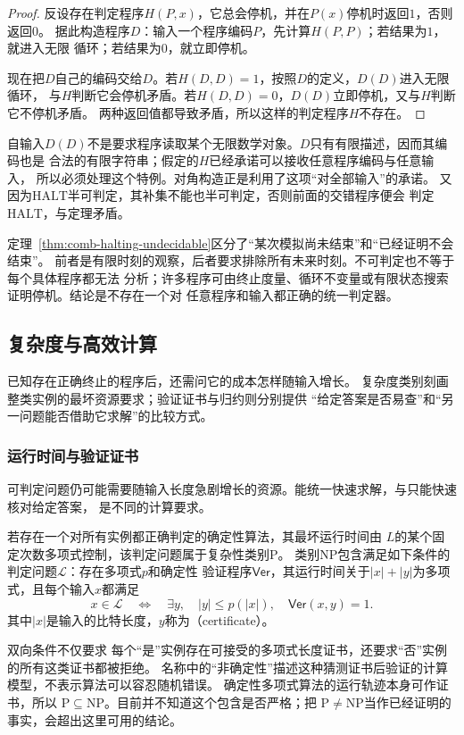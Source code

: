 \begin{proof}
反设存在判定程序$H(P,x)$，它总会停机，并在$P(x)$停机时返回$1$，否则返回$0$。
据此构造程序$D$：输入一个程序编码$P$，先计算$H(P,P)$；若结果为$1$，就进入无限
循环；若结果为$0$，就立即停机。

现在把$D$自己的编码交给$D$。若$H(D,D)=1$，按照$D$的定义，$D(D)$进入无限循环，
与$H$判断它会停机矛盾。若$H(D,D)=0$，$D(D)$立即停机，又与$H$判断它不停机矛盾。
两种返回值都导致矛盾，所以这样的判定程序$H$不存在。
\end{proof}

自输入$D(D)$不是要求程序读取某个无限数学对象。$D$只有有限描述，因而其编码也是
合法的有限字符串；假定的$H$已经承诺可以接收任意程序编码与任意输入，
所以必须处理这个特例。对角构造正是利用了这项“对全部输入”的承诺。
又因为$\mathrm{HALT}$半可判定，其补集不能也半可判定，否则前面的交错程序便会
判定$\mathrm{HALT}$，与定理矛盾。

定理~\ref{thm:comb-halting-undecidable}区分了“某次模拟尚未结束”和“已经证明不会结束”。
前者是有限时刻的观察，后者要求排除所有未来时刻。不可判定也不等于每个具体程序都无法
分析；许多程序可由终止度量、循环不变量或有限状态搜索证明停机。结论是不存在一个对
任意程序和输入都正确的统一判定器。

\subsection{复杂度与高效计算}
\label{sec:comb-efficient-computation}

已知存在正确终止的程序后，还需问它的成本怎样随输入增长。
复杂度类别刻画整类实例的最坏资源要求；验证证书与归约则分别提供
“给定答案是否易查”和“另一问题能否借助它求解”的比较方式。

\subsubsection{运行时间与验证证书}
\label{sec:comb-time-certificates}

可判定问题仍可能需要随输入长度急剧增长的资源。能统一快速求解，与只能快速核对给定答案，
是不同的计算要求。
\begin{definition}[复杂性类别P与NP]
\label{def:comb-p-np}
若存在一个对所有实例都正确判定的确定性算法，其最坏运行时间由
$L$的某个固定次数多项式控制，该判定问题属于复杂性类别$\mathrm{P}$。
类别$\mathrm{NP}$包含满足如下条件的判定问题$\mathcal{L}$：存在多项式$p$和确定性
验证程序$\mathsf{Ver}$，其运行时间关于$|x|+|y|$为多项式，且每个输入$x$都满足
\[
  x\in\mathcal{L}
  \quad\Longleftrightarrow\quad
  \exists y,\quad |y|\leq p(|x|),\quad \mathsf{Ver}(x,y)=1.
\]
其中$|x|$是输入的比特长度，$y$称为（certificate）。
\end{definition}
双向条件不仅要求
每个“是”实例存在可接受的多项式长度证书，还要求“否”实例的所有这类证书都被拒绝。
名称中的“非确定性”描述这种猜测证书后验证的计算模型，不表示算法可以容忍随机错误。
确定性多项式算法的运行轨迹本身可作证书，所以
$\mathrm{P}\subseteq\mathrm{NP}$。目前并不知道这个包含是否严格；把
$\mathrm{P}\neq\mathrm{NP}$当作已经证明的事实，会超出这里可用的结论。

